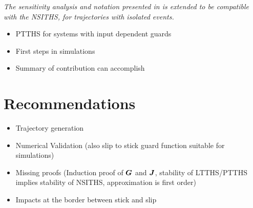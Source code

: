 \documentclass[../DC2017114Bouma.tex]{subfiles}
\begin{document}
\textit{The sensitivity analysis and notation presented in \cite{Rijnen2018a} is extended to be compatible with the NSITHS, for trajectories with isolated events.}


\begin{itemize}
\item PTTHS for systems with input dependent guards
\item First steps in simulations
\item Summary of contribution can accomplish
\end{itemize}

\section{Recommendations}
\begin{itemize}
\item Trajectory generation
\item Numerical Validation (also slip to stick guard function suitable for simulations)
\item Missing proofs (Induction proof of ${\boldsymbol{G}}$ and ${\boldsymbol{J}}$, stability of LTTHS/PTTHS implies stability of NSITHS, approximation is first order)
\item Impacts at the border between stick and slip
\end{itemize}
\end{document}
